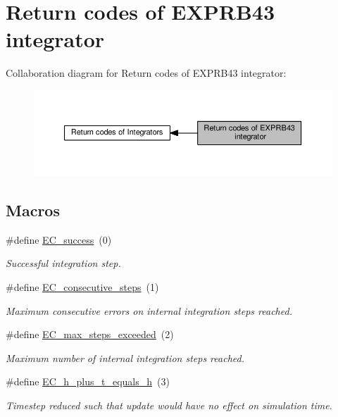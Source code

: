 \hypertarget{group__exprb43__ErrCodes}{}\section{Return codes of E\+X\+P\+R\+B43 integrator}
\label{group__exprb43__ErrCodes}
Collaboration diagram for Return codes of E\+X\+P\+R\+B43 integrator\+:\nopagebreak
\begin{figure}[H]
\begin{center}
\leavevmode
\includegraphics[width=350pt]{group__exprb43__ErrCodes}
\end{center}
\end{figure}
\subsection*{Macros}
\begin{DoxyCompactItemize}
\item 
\#define \hyperlink{group__exprb43__ErrCodes_gabd83bc0f9f475a2189a4db4a08b790ca}{E\+C\+\_\+success}~(0)
\begin{DoxyCompactList}\small\item\em Successful integration step. \end{DoxyCompactList}\item 
\#define \hyperlink{group__exprb43__ErrCodes_gae0287841c08f86f5709660fd731615ad}{E\+C\+\_\+consecutive\+\_\+steps}~(1)
\begin{DoxyCompactList}\small\item\em Maximum consecutive errors on internal integration steps reached. \end{DoxyCompactList}\item 
\#define \hyperlink{group__exprb43__ErrCodes_ga0f0275d9851ab5c19b79a963d5084df3}{E\+C\+\_\+max\+\_\+steps\+\_\+exceeded}~(2)
\begin{DoxyCompactList}\small\item\em Maximum number of internal integration steps reached. \end{DoxyCompactList}\item 
\#define \hyperlink{group__exprb43__ErrCodes_ga9326efd544880e2683c4453365ca2704}{E\+C\+\_\+h\+\_\+plus\+\_\+t\+\_\+equals\+\_\+h}~(3)
\begin{DoxyCompactList}\small\item\em Timestep reduced such that update would have no effect on simulation time. \end{DoxyCompactList}\end{DoxyCompactItemize}


